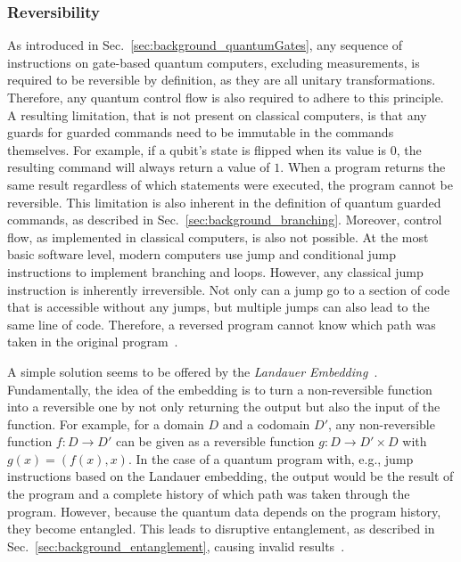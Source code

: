 \subsubsection{Reversibility}
\label{sec:background_controlflow_reversibility}
As introduced in Sec.~\ref{sec:background_quantumGates}, any sequence of instructions on gate-based quantum computers, excluding measurements, is required to be reversible by definition, as they are all unitary transformations. Therefore, any quantum control flow is also required to adhere to this principle. A resulting limitation, that is not present on classical computers, is that any guards for guarded commands need to be immutable in the commands themselves. For example, if a qubit's state is flipped when its value is $0$, the resulting command will always return a value of $1$. When a program returns the same result regardless of which statements were executed, the program cannot be reversible. This limitation is also inherent in the definition of quantum guarded commands, as described in Sec.~\ref{sec:background_branching}.
Moreover, control flow, as implemented in classical computers, is also not possible. At the most basic software level, modern computers use jump and conditional jump instructions to implement branching and loops. However, any classical jump instruction is inherently irreversible. Not only can a jump go to a section of code that is accessible without any jumps, but multiple jumps can also lead to the same line of code. Therefore, a reversed program cannot know which path was taken in the original program~\cite{YVC24}.

A simple solution seems to be offered by the \emph{Landauer Embedding}~\cite{Land61}. Fundamentally, the idea of the embedding is to turn a non-reversible function into a reversible one by not only returning the output but also the input of the function. For example, for a domain $D$ and a codomain $D'$, any non-reversible function $f : D \to D'$ can be given as a reversible function $g : D \to D' \times D$ with $g(x) = (f(x), x)$. In the case of a quantum program with, e.g., jump instructions based on the Landauer embedding, the output would be the result of the program and a complete history of which path was taken through the program. However, because the quantum data depends on the program history, they become entangled. This leads to disruptive entanglement, as described in Sec.~\ref{sec:background_entanglement}, causing invalid results~\cite{YVC24}.


